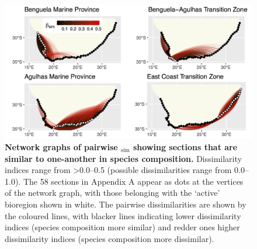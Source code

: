 \documentclass[utf8]{frontiersSCNS} %
\begin{document}
\begin{figure}[!ht]
\centering
\includegraphics[width=1.0\textwidth]{../figures/Fig4.jpg}
\caption{{\bf Network graphs of pairwise \textbeta$_{\text{sim}}$ showing sections that are similar to one-another in species composition.} Dissimilarity indices range from \textgreater{}0.0--0.5 (possible dissimilarities range from 0.0--1.0). The 58 sections in Appendix A appear as dots at the vertices of the network graph, with those belonging with the `active' bioregion shown in white. The pairwise dissimilarities are shown by the coloured lines, with blacker lines indicating lower dissimilarity indices (species composition more similar) and redder ones higher dissimilarity indices (species composition more dissimilar).}
\label{fig4}
\end{figure}
\end{document}
